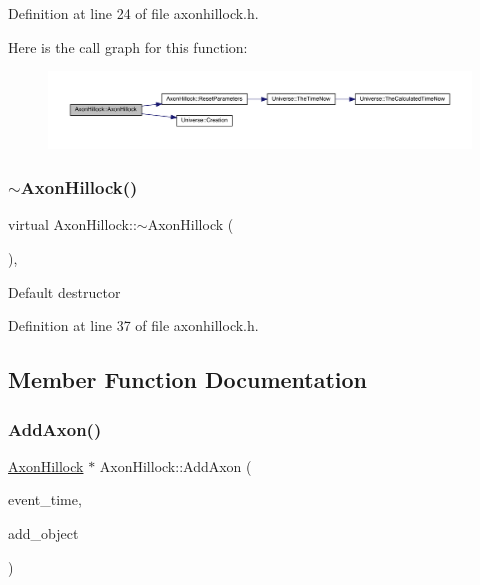 Definition at line 24 of file axonhillock.\+h.

Here is the call graph for this function\+:
\nopagebreak
\begin{figure}[H]
\begin{center}
\leavevmode
\includegraphics[width=350pt]{class_axon_hillock_a250945e24a51475369b6c7881c0d955b_cgraph}
\end{center}
\end{figure}
\mbox{\label{class_axon_hillock_ae86220026d7c87edc1c514521d66f992}} 
\subsubsection{\texorpdfstring{$\sim$\+Axon\+Hillock()}{~AxonHillock()}}
{\footnotesize\ttfamily virtual Axon\+Hillock\+::$\sim$\+Axon\+Hillock (\begin{DoxyParamCaption}{ }\end{DoxyParamCaption})\hspace{0.3cm}{\ttfamily [inline]}, {\ttfamily [virtual]}}

Default destructor 

Definition at line 37 of file axonhillock.\+h.



\subsection{Member Function Documentation}
\mbox{\label{class_axon_hillock_a02bfbaea9ea7a160933f8500c8b41d6a}} 
\subsubsection{\texorpdfstring{Add\+Axon()}{AddAxon()}}
{\footnotesize\ttfamily \hyperlink{class_axon_hillock}{Axon\+Hillock} $\ast$ Axon\+Hillock\+::\+Add\+Axon (\begin{DoxyParamCaption}\item[{std\+::chrono\+::time\+\_\+point$<$ \hyperlink{universe_8h_a0ef8d951d1ca5ab3cfaf7ab4c7a6fd80}{Clock} $>$}]{event\+\_\+time,  }\item[{\hyperlink{class_axon_hillock}{Axon\+Hillock} $\ast$}]{add\+\_\+object }\end{DoxyParamCaption})}



